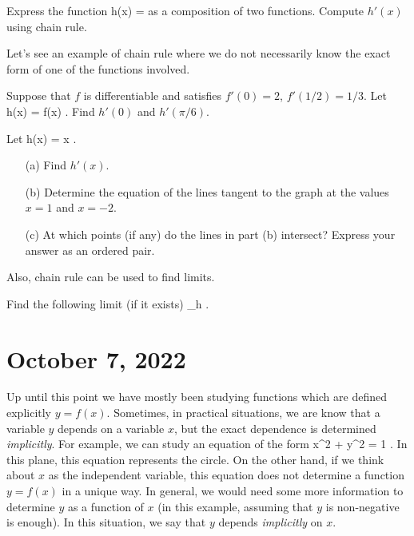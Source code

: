 \documentclass[11pt]{amsart}
\begin{document}
\vspace{3cm} 

\begin{eg}
Express the function
\beqn
h(x) =  
\eeqn
as a composition of two functions. 
Compute $h'(x)$ using chain rule.
\end{eg}

\vspace{5cm}

Let's see an example of chain rule where we do not necessarily know the exact form of one of the functions involved. 

\begin{eg}
Suppose that $f$ is differentiable and satisfies $f'(0) = 2$, $f'(1/2)=1/3$.
Let
\beqn
h(x) = f(\sin x) .
\eeqn
Find $h'(0)$ and $h'(\pi/6)$.
\end{eg} 

\newpage

\begin{eg} 
Let
\beqn
h(x) = x  .
\eeqn
\begin{itemize} 
\item[(a)] Find $h'(x)$. 
\item[(b)] Determine the equation of the lines tangent to the graph at the values $x=1$ and $x=-2$.
\item[(c)] At which points (if any) do the lines in part (b) intersect? Express your answer as an ordered pair. 
\end{itemize} 
\end{eg} 


\newpage

Also, chain rule can be used to find limits. 

\begin{eg} 
Find the following limit (if it exists)
\beqn
\lim_{h }  .
\eeqn
\end{eg} 


\newpage

\section*{October 7, 2022}

Up until this point we have mostly been studying functions which are defined explicitly $y = f(x)$. 
Sometimes, in practical situations, we are know that a variable $y$ depends on a variable $x$, but the exact dependence is determined {\em implicitly}. 
For example, we can study an equation of the form 
\beqn
x^2 + y^2 = 1 .
\eeqn
In this plane, this equation represents the circle. 
On the other hand, if we think about $x$ as the independent variable, this equation does not determine a function $y = f(x)$ in a unique way.
In general, we would need some more information to determine $y$ as a function of $x$ (in this example, assuming that $y$ is non-negative is enough). 
In this situation, we say that $y$ depends {\em implicitly} on $x$.
\end{document}

